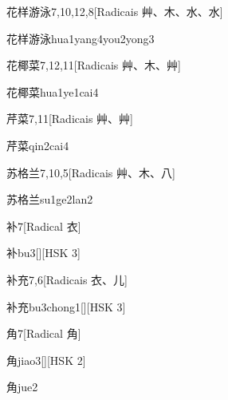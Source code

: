 \begin{entry}{花样游泳}{7,10,12,8}[Radicais ⾋、⽊、⽔、⽔]
  \begin{phonetics}{花样游泳}{hua1yang4you2yong3}
  \end{phonetics}
\end{entry}

\begin{entry}{花椰菜}{7,12,11}[Radicais ⾋、⽊、⾋]
  \begin{phonetics}{花椰菜}{hua1ye1cai4}
  \end{phonetics}
\end{entry}

\begin{entry}{芹菜}{7,11}[Radicais ⾋、⾋]
  \begin{phonetics}{芹菜}{qin2cai4}
  \end{phonetics}
\end{entry}

\begin{entry}{苏格兰}{7,10,5}[Radicais ⾋、⽊、⼋]
  \begin{phonetics}{苏格兰}{su1ge2lan2}
  \end{phonetics}
\end{entry}

\begin{entry}{补}{7}[Radical ⾐]
  \begin{phonetics}{补}{bu3}[][HSK 3]
  \end{phonetics}
\end{entry}

\begin{entry}{补充}{7,6}[Radicais ⾐、⼉]
  \begin{phonetics}{补充}{bu3chong1}[][HSK 3]
  \end{phonetics}
\end{entry}

\begin{entry}{角}{7}[Radical ⾓]
  \begin{phonetics}{角}{jiao3}[][HSK 2]
  \end{phonetics}
  \begin{phonetics}{角}{jue2}
  \end{phonetics}
\end{entry}

